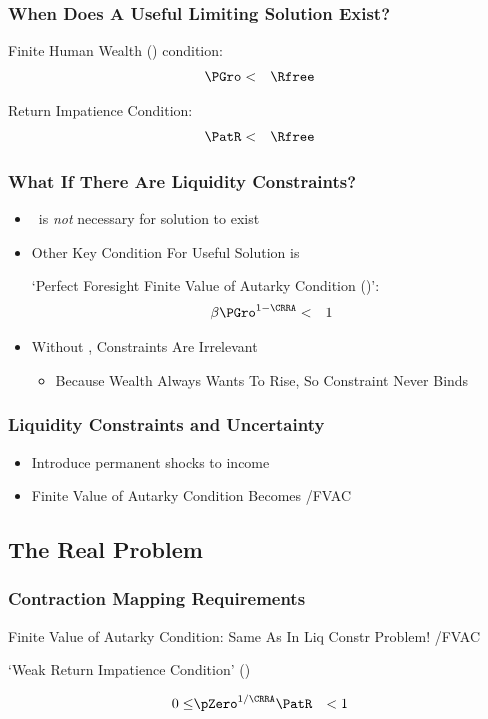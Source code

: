\documentclass[pdflatex]{beamer}\providecommand{\texname}{BufferStockTheory-Slides}%
\begin{document}
\begin{frame}
\frametitle{When Does A Useful Limiting Solution Exist?}

Finite Human Wealth (\FHWC) condition:
\begin{eqnarray}
\PGro & < & \Rfree
\end{eqnarray}

\pause\medskip
Return Impatience Condition:
\begin{eqnarray}
\PatR & < & \Rfree
\end{eqnarray}

\end{frame}

\begin{frame}
\frametitle{What If There Are Liquidity Constraints?}

\pause 

\begin{itemize}
\item \FHWC~is {\it not} necessary for solution to exist
\item Other Key Condition For Useful Solution is

`Perfect Foresight Finite Value of Autarky Condition (\PFFVAC)':
\begin{eqnarray}
\beta \PGro^{1-\CRRA} & < & 1  
\end{eqnarray}

\item Without \RIC, Constraints Are Irrelevant
\begin{itemize}
\item Because Wealth Always Wants To Rise, So Constraint Never Binds
\end{itemize}
\end{itemize}

\end{frame}

\begin{frame}
\frametitle{Liquidity Constraints and Uncertainty}

\begin{itemize}
\item Introduce permanent shocks to income
\item Finite Value of Autarky Condition Becomes
 \LtxDir\EqDir/FVAC
\end{itemize}

\end{frame}



\subsection{The Real Problem}
\begin{frame}
\frametitle{Contraction Mapping Requirements}

Finite Value of Autarky Condition: Same As In Liq Constr Problem!
 \LtxDir\EqDir/FVAC

`Weak Return Impatience Condition' (\WRIC)

\begin{eqnarray}
 0 \leq & \pZero^{1/\CRRA} \PatR & < 1 \label{eq:WRIC}
\end{eqnarray}

\end{frame}
\end{document}
